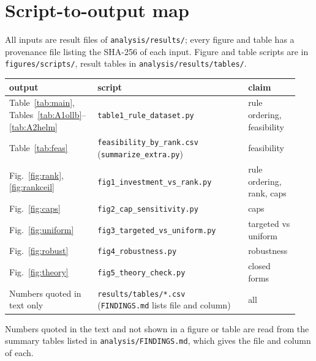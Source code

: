 \section{Script-to-output map}
\label{app:map}
All inputs are result files of \texttt{analysis/results/}; every figure and table has a provenance file listing the SHA-256 of each input. Figure and table scripts are in \texttt{figures/scripts/}, result tables in \texttt{analysis/results/tables/}.
\begin{center}\small
\begin{tabular}{@{}p{0.27\linewidth}p{0.5\linewidth}p{0.17\linewidth}@{}}
\toprule
output & script & claim \\
\midrule
Table~\ref{tab:main}, Tables~\ref{tab:A1ollb}--\ref{tab:A2helm} & \texttt{table1\_rule\_dataset.py} & rule ordering, feasibility \\
Table~\ref{tab:feas} & \texttt{feasibility\_by\_rank.csv} (\texttt{summarize\_extra.py}) & feasibility \\
Fig.~\ref{fig:rank}, \ref{fig:rankceil} & \texttt{fig1\_investment\_vs\_rank.py} & rule ordering, rank, caps \\
Fig.~\ref{fig:caps} & \texttt{fig2\_cap\_sensitivity.py} & caps \\
Fig.~\ref{fig:uniform} & \texttt{fig3\_targeted\_vs\_uniform.py} & targeted vs uniform \\
Fig.~\ref{fig:robust} & \texttt{fig4\_robustness.py} & robustness \\
Fig.~\ref{fig:theory} & \texttt{fig5\_theory\_check.py} & closed forms \\
Numbers quoted in text only & \texttt{results/tables/*.csv} (\texttt{FINDINGS.md} lists file and column) & all \\
\bottomrule
\end{tabular}
\end{center}
Numbers quoted in the text and not shown in a figure or table are read from the summary tables listed in \texttt{analysis/FINDINGS.md}, which gives the file and column of each.


